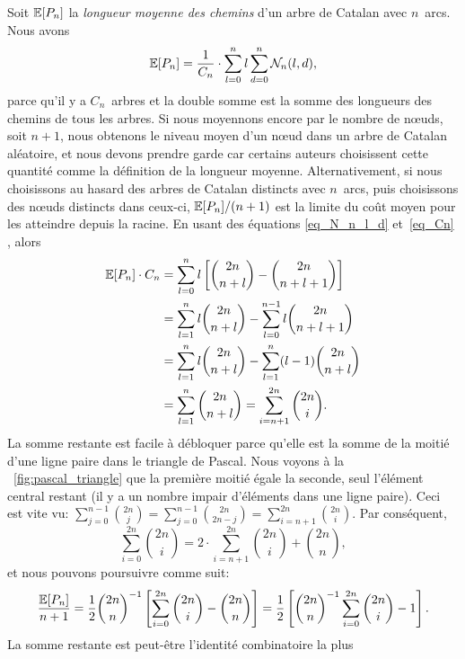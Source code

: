 Soit \(\mathbb{E}[{P_n}]\) la \emph{longueur moyenne des chemins} d'un
arbre de Catalan avec \(n\)~arcs. Nous avons
\begin{equation*}
  \mathbb{E}[{P_n}] = \frac{1}{C_{n}} \cdot \sum_{l=0}^{n}l\sum_{d=0}^{n}\mathcal{N}_n(l,d),
\end{equation*}
parce qu'il y a \(C_n\)~arbres et la double somme est la somme des
longueurs des chemins de tous les arbres. Si nous moyennons encore par
le nombre de n{\oe}uds, soit \(n+1\), nous obtenons le niveau moyen
d'un n{\oe}ud dans un arbre de Catalan aléatoire, et nous devons
prendre garde car certains auteurs choisissent cette quantité comme la
définition de la longueur moyenne. Alternativement, si nous
choisissons au hasard des arbres de Catalan distincts avec \(n\)~arcs,
puis choisissons des n{\oe}uds distincts dans ceux-ci,
\(\mathbb{E}[{P_n}]/(n+1)\) est la limite du coût moyen pour les
atteindre depuis la racine. En usant des équations \eqref{eq_N_n_l_d}
et~\eqref{eq_Cn} , alors
\begin{align*}
\mathbb{E}[{P_n}] \cdot C_n
 &= \sum_{l=0}^{n}l\left[\binom{2n}{n+l} - \binom{2n}{n+l+1}\right]\\
 &= \sum_{l=1}^{n}l \binom{2n}{n+l} - \sum_{l=0}^{n-1}l \binom{2n}{n+l+1}\\
 &= \sum_{l=1}^{n}l \binom{2n}{n+l} - \sum_{l=1}^{n}(l-1)\binom{2n}{n+l}\\
 &= \sum_{l=1}^{n}\binom{2n}{n+l}
  = \sum_{i=n+1}^{2n}\binom{2n}{i}.
\end{align*}
La somme restante est facile à débloquer parce qu'elle est la somme de
la moitié d'une ligne paire dans le triangle de Pascal. Nous voyons à
la \fig~\vref{fig:pascal_triangle} que la première moitié égale la
seconde, seul l'élément central restant (il y a un nombre impair
d'éléments dans une ligne paire). Ceci est vite vu:
\(\sum_{j=0}^{n-1}\binom{2n}{j} = \sum_{j=0}^{n-1}\binom{2n}{2n-j} =
\sum_{i=n+1}^{2n}\binom{2n}{i}\). Par conséquent,
\begin{equation*}
\sum_{i=0}^{2n}\binom{2n}{i} = 2 \cdot \!\! \sum_{i=n+1}^{2n}\binom{2n}{i}
+ \binom{2n}{n},
\end{equation*}
et nous pouvons poursuivre comme suit:
\begin{equation*}
\frac{\mathbb{E}[{P_n}]}{n+1}
  = \frac{1}{2}\binom{2n}{n}^{-1}\left[\sum_{i=0}^{2n}\binom{2n}{i} -
    \binom{2n}{n}\right]
  = \frac{1}{2}\left[\binom{2n}{n}^{-1}\sum_{i=0}^{2n}\binom{2n}{i} - 1\right].
\end{equation*}
La somme restante est peut-être l'identité combinatoire la plus
